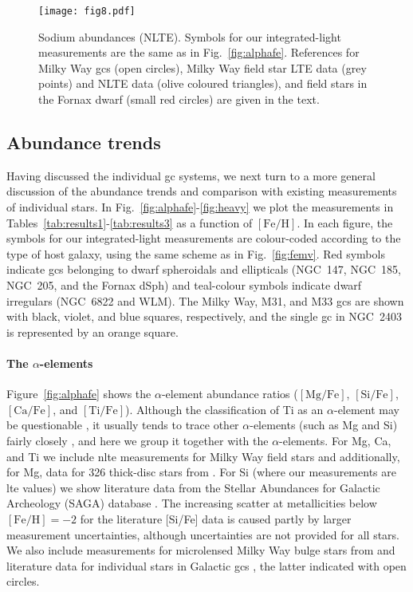 \documentclass{aa}
\begin{document}
\begin{figure}
\centering
\texttt{[image: fig8.pdf]}
\caption{\label{fig:nafe}Sodium abundances (NLTE). Symbols for our integrated-light measurements are the same as in Fig.~\ref{fig:alphafe}. References for Milky Way \acp{gc} (open circles), Milky Way field star LTE data (grey points) and NLTE data (olive coloured triangles), and field stars in the Fornax dwarf (small red circles) are given in the text.}
\end{figure}


\subsection{Abundance trends} 
\label{sec:abundance_trends}

Having discussed the individual \ac{gc} systems, we next turn to a more general discussion of the abundance trends and comparison with existing measurements of individual stars. 
In Fig.~\ref{fig:alphafe}-\ref{fig:heavy} we plot the measurements  in Tables~\ref{tab:results1}-\ref{tab:results3} as a function of $\mathrm{[Fe/H]}$. In each figure, the  symbols for our integrated-light measurements are colour-coded according to the type of host galaxy, using the same scheme as in Fig.~\ref{fig:femv}. Red symbols indicate \acp{gc} belonging to dwarf spheroidals and ellipticals (NGC~147, NGC~185, NGC~205, and the Fornax dSph) and teal-colour symbols indicate dwarf irregulars (NGC~6822 and WLM). The Milky Way, M31, and M33 \acp{gc} are shown with black, violet, and blue squares, respectively, and the single \ac{gc} in NGC~2403 is represented by an orange square. 

\paragraph{The $\alpha$-elements}

Figure~\ref{fig:alphafe} shows the $\alpha$-element abundance ratios ($\mathrm{[Mg/Fe]}$, $\mathrm{[Si/Fe]}$, $\mathrm{[Ca/Fe]}$, and $\mathrm{[Ti/Fe]}$). 
Although the classification of Ti as an $\alpha$-element may be questionable \citep{Woosley1995}, it usually tends to trace other $\alpha$-elements (such as Mg and Si) fairly closely \citep{Conroy2014,Parikh2019}, and here we group it together with the $\alpha$-elements.
For Mg, Ca, and Ti we include \ac{nlte} measurements for Milky Way field stars \citep{Zhao2016,Mashonkina2017,Mashonkina2019,Mishenina2017} and additionally, for Mg, data for 326 thick-disc stars from \citet{Bergemann2017}. For Si (where our measurements are \ac{lte} values) we show literature data from the Stellar Abundances for Galactic Archeology (SAGA) database \citep{Suda2008}.  The increasing scatter at metallicities below $\mathrm{[Fe/H]}=-2$ for the literature [Si/Fe] data is caused partly by larger measurement uncertainties, although uncertainties are not provided for all stars. We also include measurements for microlensed Milky Way bulge stars from \citet{Bensby2017} and literature data for individual stars in Galactic \acp{gc} \citep[][R2014]{Roediger2014}, the latter indicated with open circles. 
\end{document}
